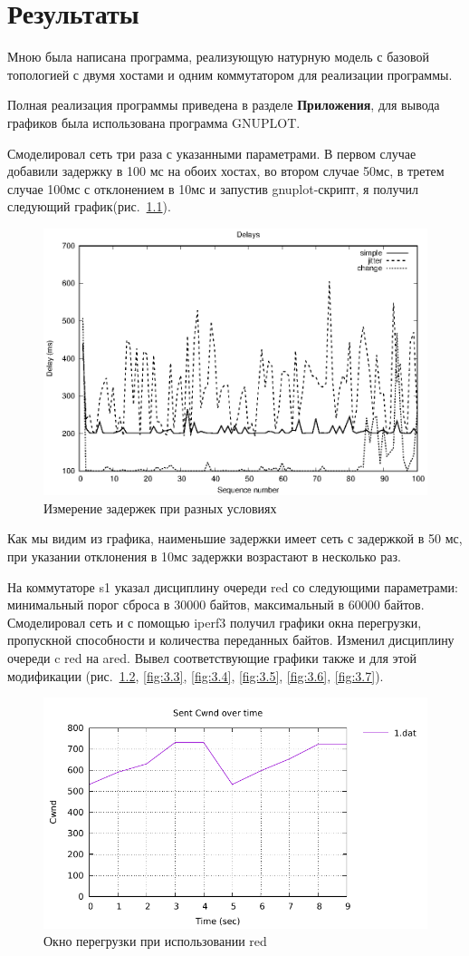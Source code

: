\chapter{Результаты}

Мною была написана программа, реализующую натурную модель с 
базовой топологией с двумя хостами и одним коммутатором для реализации
программы.
 
Полная реализация программы приведена в разделе \textbf{Приложения},
для вывода графиков была использована программа GNUPLOT.

Смоделировал сеть три раза с указанными параметрами. В первом случае добавили задержку в 100 мс на обоих хостах, во втором случае 50мс, в третем случае 100мс с отклонением в 10мс и запустив gnuplot-скрипт, я получил следующий график(рис.~\ref{fig:3.1}).

\begin{figure}[!ht]
  \centering
  \includegraphics[width=0.6\linewidth]{image/pings.eps}
  \caption{Измерение задержек при разных условиях}
  \label{fig:3.1}
\end{figure}

Как мы видим из графика, наименьшие задержки имеет сеть с задержкой в 50 мс, при указании отклонения в 10мс задержки возрастают в несколько раз.


На коммутаторе s1 указал дисциплину очереди red со следующими параметрами: минимальный порог сброса в 30000 байтов, максимальный в 60000 байтов.
Смоделировал сеть и с помощью iperf3 получил графики окна перегрузки, пропускной способности и количества переданных байтов. Изменил дисциплину очереди c red на ared. Вывел соответствующие графики также и для этой модификации (рис.~\ref{fig:3.2}, \ref{fig:3.3}, \ref{fig:3.4}, \ref{fig:3.5}, \ref{fig:3.6}, \ref{fig:3.7}).

\begin{figure}[!ht]
  \centering
  \includegraphics[width=0.6\linewidth]{image/red/cwnd_red.pdf}
  \caption{Окно перегрузки при использовании red}
  \label{fig:3.2}
\end{figure}

